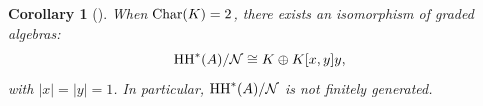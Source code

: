 \documentclass[10pt, reqno]{amsart}
\newtheorem{corollary}[theorem]{Corollary}
\theoremstyle{definition}
\theoremstyle{remark}
\numberwithin{equation}{section}
\begin{document}
\begin{corollary}[{\cite[Section 3.1]{Xu08}}] When $\mathrm{Char} (K)=2$, there exists  an isomorphism of graded algebras:
\[
\mathrm{HH}^*(A)/\mathcal{N}
\cong K\oplus K[x,y]y,
\]
with \(|x|=|y|=1\). 
    In particular, \(\mathrm{HH}^*(A)/\mathcal{N}\) is not finitely generated.
\end{corollary}

\end{document}
